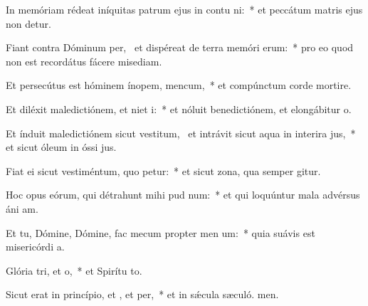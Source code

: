 \item In memóriam rédeat iníquitas patrum ejus in contu ni:~* et peccátum matris ejus non detur.
\item Fiant contra Dóminum per,~\pscross{} et dispéreat de terra memóri erum:~* pro eo quod non est recordátus fácere misediam.
\item Et persecútus est hóminem ínopem,  mencum,~* et compúnctum corde mortire.
\item Et diléxit maledictiónem, et niet i:~* et nóluit benedictiónem, et elongábitur  o.
\item Et índuit maledictiónem sicut vestitum,~\pscross{} et intrávit sicut aqua in interira jus,~* et sicut óleum in óssi jus.
\item Fiat ei sicut vestiméntum, quo petur:~* et sicut zona, qua semper gitur.
\item Hoc opus eórum, qui détrahunt mihi pud num:~* et qui loquúntur mala advérsus áni am.
\item Et tu, Dómine, Dómine, fac mecum propter men um:~* quia suávis est misericórdi a.
\item Glória tri, et o,~* et Spirítu to.
\item Sicut erat in princípio, et , et per,~* et in sǽcula sæculó. men.
